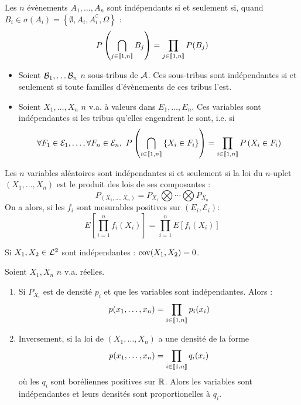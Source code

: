 \documentclass{cours}
\begin{document}
\begin{proposition}
    Les $n$ évènements $A_{1}, \ldots, A_{n}$ sont indépendants si et seulement si, quand $B_{i} \in \sigma\left(A_{i}\right) = \left\{\emptyset, A_{i}, A_{i}^{\complement}, \Omega\right\}$ :
    \[
        P\left(\bigcap_{j \in \left\llbracket 1, n\right\rrbracket} B_{j}\right) = \prod_{j \in \left\llbracket 1, n\right\rrbracket} P(B_{j})
    \]
\end{proposition}

\begin{definition}
    \begin{itemize}
        \item Soient $\mathcal{B}_{1}, \ldots \mathcal{B}_{n}$ $n$ sous-tribus de $\mathcal{A}$. Ces sous-tribus sont indépendantes si et seulement si toute familles d'évènements de ces tribus l'est.
        \item Soient $X_{1}, \ldots, X_{n}$ $n$ v.a. à valeurs dans $E_{1}, \ldots, E_{n}$. Ces variables sont indépendantes si les tribus qu'elles engendrent le sont, i.e. si
              \[
                  \forall F_{1} \in \mathcal{E}_{1}, \ldots, \forall F_{n} \in \mathcal{E}_{n}, \ P\left(\bigcap_{i \in \onen{n}}\left\{X_{i} \in F_{i}\right\}\right) = \prod_{i \in \onen{n}} P\left(X_{i} \in F_{i}\right)
              \]
    \end{itemize}
\end{definition}

\begin{theorem}
    Les $n$ variables aléatoires sont indépendantes si et seulement si la loi du $n$-uplet $\left(X_{1}, \ldots, X_{n}\right)$ est le produit des lois de ses composantes :
    \[
        P_{\left(X_{1}, \ldots, X_{n}\right)} = P_{X_{1}} \bigotimes \cdots \bigotimes P_{X_{n}}
    \]
    On a alors, si les $f_{i}$ sont mesurables positives sur $\left(E_{i}, \mathcal{E}_{i}\right)$:
    \[
        E\left[\prod_{i = 1}^{n}f_{i}(X_{i})\right] = \prod_{i = 1}^{n} E\left[f_{i}(X_{i})\right]
    \]
\end{theorem}
\begin{corollary}
    Si $X_{1}, X_{2} \in \mathcal{L}^{2}$ sont indépendantes : $\operatorname{cov}(X_{1}, X_{2}) = 0$.
\end{corollary}

\begin{corollary}
    Soient $X_{1}, X_{n}$ $n$ v.a. réelles.
    \begin{enumerate}
        \item Si $P_{X_{i}}$ est de densité $p_{i}$ et que les variables sont indépendantes. Alors :
              \[p(x_{1}, \ldots, x_{n}) = \prod_{i\in \left\llbracket 1, n\right\rrbracket} p_{i}(x_{i})\]
        \item Inversement, si la loi de $\left(X_{1}, \ldots, X_{n}\right)$ a une densité de la forme \[p(x_{1}, \ldots, x_{n}) = \prod_{i\in \left\llbracket 1, n\right\rrbracket} q_{i}(x_{i})\] où les $q_{i}$ sont boréliennes positives sur $\mathbb{R}$. Alors les variables sont indépendantes et leurs densités sont proportionelles à $q_{i}$.
    \end{enumerate}
\end{corollary}
\end{document}
